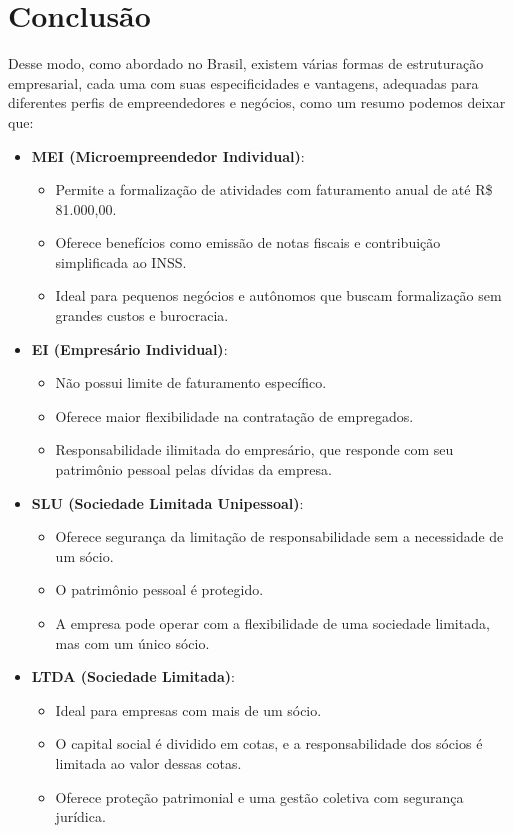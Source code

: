 \section{Conclusão}

Desse modo, como abordado no Brasil, existem várias formas de estruturação empresarial, cada uma com suas especificidades e vantagens, adequadas para diferentes perfis de empreendedores e negócios, como um resumo podemos deixar que:
\begin{itemize}
    \item \textbf{MEI (Microempreendedor Individual)}:
          \begin{itemize}
              \item Permite a formalização de atividades com faturamento anual de até R\$ 81.000,00.
              \item Oferece benefícios como emissão de notas fiscais e contribuição simplificada ao INSS.
              \item Ideal para pequenos negócios e autônomos que buscam formalização sem grandes custos e burocracia.
          \end{itemize}

    \item \textbf{EI (Empresário Individual)}:
          \begin{itemize}
              \item Não possui limite de faturamento específico.
              \item Oferece maior flexibilidade na contratação de empregados.
              \item Responsabilidade ilimitada do empresário, que responde com seu patrimônio pessoal pelas dívidas da empresa.
          \end{itemize}

    \item \textbf{SLU (Sociedade Limitada Unipessoal)}:
          \begin{itemize}
              \item Oferece segurança da limitação de responsabilidade sem a necessidade de um sócio.
              \item O patrimônio pessoal é protegido.
              \item A empresa pode operar com a flexibilidade de uma sociedade limitada, mas com um único sócio.
          \end{itemize}

    \item \textbf{LTDA (Sociedade Limitada)}:
          \begin{itemize}
              \item Ideal para empresas com mais de um sócio.
              \item O capital social é dividido em cotas, e a responsabilidade dos sócios é limitada ao valor dessas cotas.
              \item Oferece proteção patrimonial e uma gestão coletiva com segurança jurídica.
          \end{itemize}


\end{itemize}
